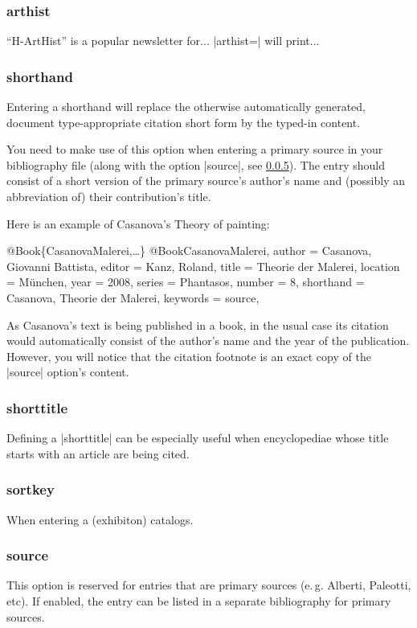 \documentclass[a4paper,
10pt,
ngerman,
english
]{ltxdoc}
\begin{document}
\subsubsection{arthist}
\enquote{H-ArtHist} is a popular newsletter for... %
|arthist=| will print...

\subsubsection{shorthand}\label{sec:shorthand}
Entering a shorthand will replace the otherwise automatically generated, document type-appropriate citation short form by the typed-in content.

You need to make use of this option when entering a primary source in your bibliography file (along with the option |source|, see \cref{sec:source}). The entry should consist of a short version of the primary source's author's name and (possibly an abbreviation of) their contribution's title.

Here is an example of Casanova's Theory of painting:
\begin{bibexample}[label=CasanovaMalerei]{{@}Book\{CasanovaMalerei,…\}}
@Book{CasanovaMalerei,
  author    = {Casanova, Giovanni Battista},
  editor    = {Kanz, Roland},
  title     = {Theorie der Malerei},
  location  = {München},
  year      = {2008},
  series    = {Phantasos},
  number    = {8},
  shorthand = {Casanova, Theorie der Malerei},
  keywords  = {source},
}
\end{bibexample}
As Casanova's text is being published in a book, in the usual case its citation would automatically consist of the author's name and the year of the publication.
However, you will notice that the citation footnote is an exact copy of the |source| option's content.

\subsubsection{shorttitle}
Defining a |shorttitle| can be especially useful when encyclopediae whose title starts with an article are being cited.

\subsubsection{sortkey}
When entering a (exhibiton) catalogs.

\subsubsection{source}\label{sec:source}
This option is reserved for entries that are primary sources (e.\,g. Alberti, Paleotti, etc). %
If enabled, the entry can be listed in a separate bibliography for primary sources.
\end{document}

